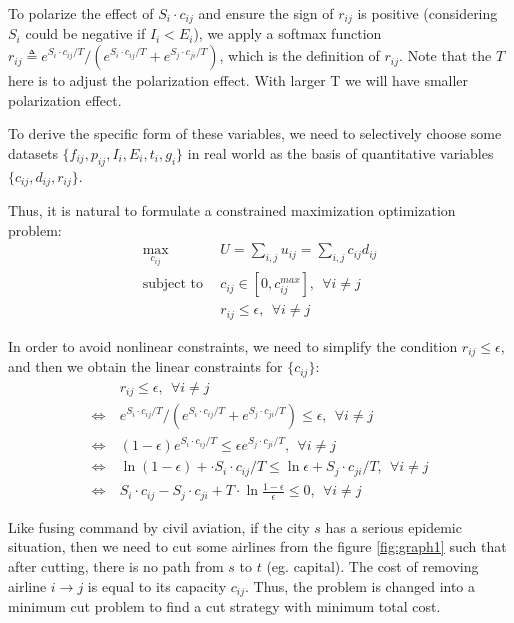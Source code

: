 To polarize the effect of $S_i \cdot c_{ij}$ and ensure the sign of $r_{ij}$ is positive (considering $S_i$ could be negative if $I_i < E_i$), we apply a softmax function $r_{ij} \triangleq e^{S_i \cdot c_{ij} / T} / (e^{S_i \cdot c_{ij} / T} + e^{S_j \cdot c_{ji} / T})$, which is the definition of $r_{ij}$. Note that the $T$ here is to adjust the polarization effect. With larger T we will have smaller polarization effect.

To derive the specific form of these variables, we need to selectively choose some datasets $\{ f_{ij},p_{ij}, I_i, E_i, t_i, g_i \}$ in real world as the basis of quantitative variables $\{ c_{ij},d_{ij}, r_{ij} \}$. 

Thus, it is natural to formulate a constrained maximization optimization problem:
\begin{align*}
    \max_{c_{ij}}~& U = \sum_{i,j} u_{ij} = \sum_{i,j} c_{ij}d_{ij}\\
    \text{subject to}~~& c_{ij} \in [0, c_{ij}^{max}],~~ \forall i \neq j \\
    & r_{ij} \le \epsilon,~~ \forall i \neq j 
\end{align*}

In order to avoid nonlinear constraints, we need to simplify the condition $r_{ij} \le \epsilon$, and then we obtain the linear constraints for $\{c_{ij}\}$:
\begin{equation*}
    \begin{aligned}
     & r_{ij} \le \epsilon,~~ \forall i \neq j \\
     \Leftrightarrow~& e^{S_i \cdot c_{ij} / T} / (e^{S_i \cdot c_{ij} / T} + e^{S_j \cdot c_{ji} / T}) \le \epsilon,~~ \forall i \neq j \\
     \Leftrightarrow~& (1-\epsilon) e^{S_i \cdot c_{ij} / T} \le \epsilon e^{S_j \cdot c_{ji} / T},~~ \forall i \neq j \\
     \Leftrightarrow~& \ln{(1-\epsilon)} + \cdot S_i \cdot c_{ij} / T \le \ln{\epsilon} + S_j \cdot c_{ji} / T,~~ \forall i \neq j \\
     \Leftrightarrow~& S_i \cdot c_{ij} - S_j \cdot c_{ji} + T \cdot \ln{\frac{1-\epsilon}{\epsilon}} \le 0,~~ \forall i \neq j
    \end{aligned}
\end{equation*}


Like fusing command by civil aviation, if the city $s$ has a serious epidemic situation, then we need to cut some airlines from the figure \ref{fig:graph1} such that
after cutting, there is no path from $s$ to $t$ (eg. capital). The cost of removing airline $i\rightarrow j$ is equal to its capacity $c_{ij}$. Thus, the problem is changed into a minimum cut problem to find a cut strategy with minimum total cost. 


